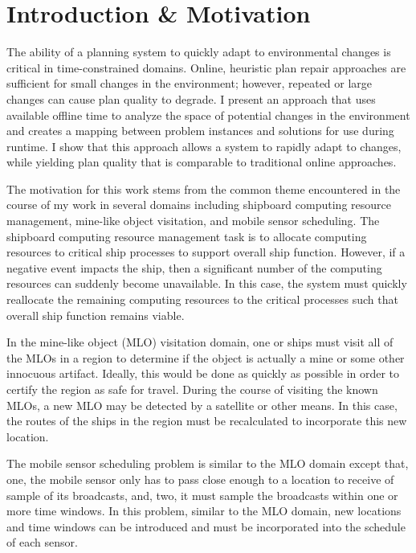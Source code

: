 \chapter{Introduction \& Motivation}
\thispagestyle{plain}

\label{ch:introduction}

The ability of a planning system to quickly adapt to environmental changes is critical in time-constrained domains.  Online, heuristic plan repair approaches are sufficient for small changes in the environment; however, repeated or large changes can cause plan quality to degrade. I present an approach that uses available offline time to analyze the space of potential changes in the environment and creates a mapping between problem instances and solutions for use during runtime.  I show that this approach allows a system to rapidly adapt to changes, while yielding plan quality that is comparable to traditional online approaches.


The motivation for this work stems from the common theme encountered in the course of my work in several domains including shipboard computing resource management, mine-like object visitation, and mobile sensor scheduling.  The shipboard computing resource management task is to allocate computing resources to critical ship processes to support overall ship function. However, if a negative event impacts the ship, then a significant number of the computing resources can suddenly become unavailable.  In this case, the system must quickly reallocate the remaining computing resources to the critical processes such that overall ship function remains viable.

In the mine-like object (MLO) visitation domain, one or ships must visit all of the MLOs in a region to determine if the object is actually a mine or some other innocuous artifact.  Ideally, this would be done as quickly as possible in order to certify the region as safe for travel.  During the course of visiting the known MLOs, a new MLO may be detected by a satellite or other means.  In this case, the routes of the ships in the region must be recalculated to incorporate this new location.

The mobile sensor scheduling problem is similar to the MLO domain except that, one, the mobile sensor only has to pass close enough to a location to receive of sample of its broadcasts, and, two, it must sample the broadcasts within one or more time windows.  In this problem, similar to the MLO domain, new locations and time windows can be introduced and must be incorporated into the schedule of each sensor.

